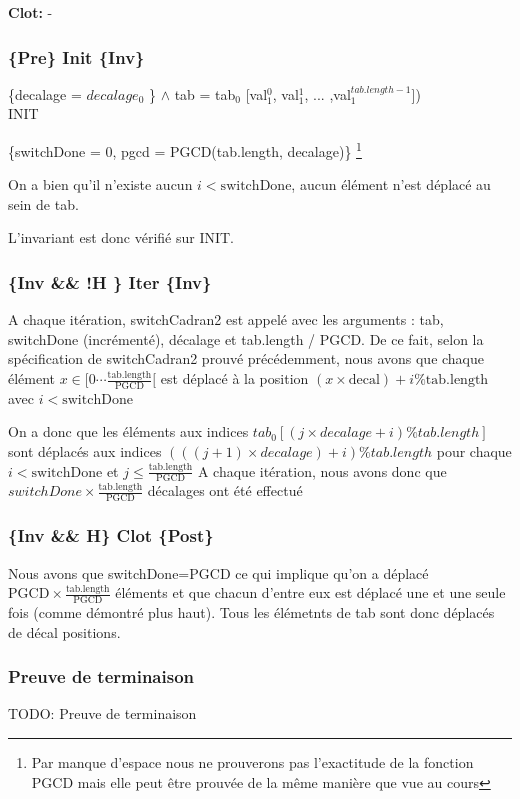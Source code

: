 \noindent \textbf{Clot: } -

\subsubsection*{\{Pre\} Init \{Inv\}}

\{decalage = $decalage_{0}$ \}
$\wedge$ tab = tab$_{0}$ [val$_{1}^{0}$, val$_{1}^{1}$, ... ,val$_{1}^{tab.length-1}$])\\

INIT

\{switchDone = 0, pgcd = PGCD(tab.length, decalage)\} \footnote{Par manque d'espace nous ne prouverons pas l'exactitude de la fonction PGCD mais elle peut être prouvée de la même manière que vue au cours}

On a bien qu'il n'existe aucun $i < \mathrm{switchDone}$, aucun élément n'est déplacé au sein de tab.

L'invariant est donc vérifié sur INIT.

\subsubsection*{\{Inv \&\& !H \} Iter \{Inv\}}

A chaque itération, switchCadran2 est appelé avec les arguments : tab,
switchDone (incrémenté), décalage et tab.length / PGCD. De ce fait,
selon la spécification de switchCadran2 prouvé précédemment, nous avons
que chaque élément $x \in [0\cdots
    \frac{\mathrm{tab.length}}{\mathrm{PGCD}}[$ est déplacé à la
        position $(x\times \mathrm{decal})+i \% \mathrm{tab.length}$ avec $i < \mathrm{switchDone}$

On a donc que les éléments aux indices $tab_{0}[(j \times decalage + i) \% tab.length]$ sont déplacés aux indices $(((j+1)\times decalage)+i) \% tab.length$ pour chaque $i < \mathrm{switchDone}$ et $j \leq \frac{\mathrm{tab.length}}{\mathrm{PGCD}}$ 
A chaque itération, nous avons donc que $switchDone \times \frac {\mathrm{tab.length}}{\mathrm{PGCD}}$ décalages ont été effectué
\subsubsection*{\{Inv \&\& H\} Clot \{Post\}}

 Nous avons que switchDone=PGCD ce qui implique qu'on a déplacé
$\mathrm{PGCD}\times \frac{\mathrm{tab.length}}{\mathrm{PGCD}}$ éléments et
que chacun d'entre eux est déplacé une et une seule fois (comme démontré
plus haut). Tous les élémetnts de tab sont donc déplacés de décal positions.

\subsubsection*{Preuve de terminaison}
TODO: Preuve de terminaison
